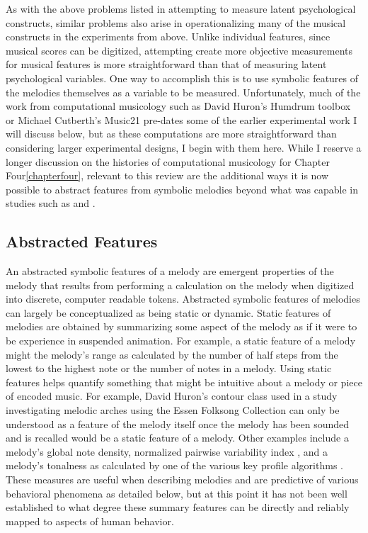 \documentclass[]{book}
\begin{document}
As with the above problems listed in attempting to measure latent psychological constructs, similar problems also arise in operationalizing many of the musical constructs in the experiments from above.
Unlike individual features, since musical scores can be digitized, attempting create more objective measurements for musical features is more straightforward than that of measuring latent psychological variables.
One way to accomplish this is to use symbolic features of the melodies themselves as a variable to be measured.
Unfortunately, much of the work from computational musicology such as David Huron's Humdrum toolbox \citep{huronHumdrumToolkitReference1994} or Michael Cutberth's Music21 \citep{cuthbertMusic21ToolkitComputerAided2010} pre-dates some of the earlier experimental work I will discuss below, but as these computations are more straightforward than considering larger experimental designs, I begin with them here.
While I reserve a longer discussion on the histories of computational musicology for Chapter Four\ref{chapterfour}, relevant to this review are the additional ways it is now possible to abstract features from symbolic melodies beyond what was capable in studies such as \citet{ortmannTonalDeterminantsMelodic1933} and \citet{taylorStrategiesMemoryShort1983}.

\hypertarget{abstracted-features}{%
\subsection{Abstracted Features}\label{abstracted-features}}

An abstracted symbolic features of a melody are emergent properties of the melody that results from performing a calculation on the melody when digitized into discrete, computer readable tokens.
Abstracted symbolic features of melodies can largely be conceptualized as being static or dynamic.
Static features of melodies are obtained by summarizing some aspect of the melody as if it were to be experience in suspended animation.
For example, a static feature of a melody might the melody's range as calculated by the number of half steps from the lowest to the highest note or the number of notes in a melody.
Using static features helps quantify something that might be intuitive about a melody or piece of encoded music.
For example, David Huron's contour class used in a study investigating melodic arches \citep{huronMelodicArchWestern1996} using the Essen Folksong Collection \citep{schaffrathEssenFolkSong1995} can only be understood as a feature of the melody itself once the melody has been sounded and is recalled would be a static feature of a melody.
Other examples include a melody's global note density, normalized pairwise variability index \citep{grabeDurationalVariabilitySpeech2002}, and a melody's tonalness as calculated by one of the various key profile algorithms \citep{krumhanslCognitiveFoundationsMusical2001}.
These measures are useful when describing melodies and are predictive of various behavioral phenomena as detailed below, but at this point it has not been well established to what degree these summary features can be directly and reliably mapped to aspects of human behavior.
\end{document}
